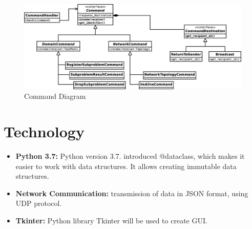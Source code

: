 \documentclass{article}
\begin{document}
\begin{figure}[H]
	\centering
	\includegraphics[width=\linewidth]{diagrams/CommandDiagram.eps}
	\caption{Command Diagram}
\end{figure}

\section{Technology}
\begin{itemize}
    \item \textbf{Python 3.7:} Python version 3.7. introduced @dataclass, which makes it easier to work with data structures.
    It allows creating immutable data structures.
    \item \textbf{Network Communication:} transmission of data in JSON format, using UDP protocol.
    \item \textbf{Tkinter:} Python library Tkinter will be used to create GUI.
\end{itemize}
\end{document}
